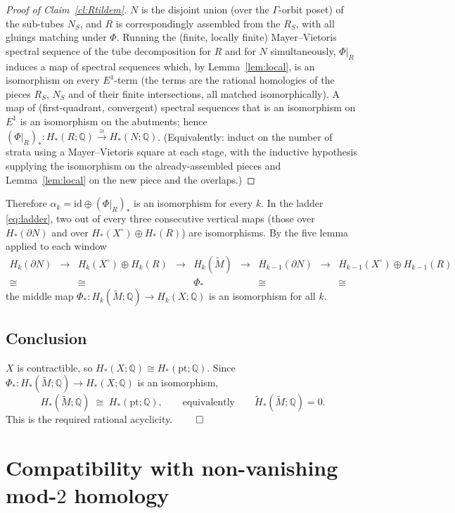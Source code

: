 \documentclass[12pt]{article}
\begin{document}
\begin{proof}[Proof of Claim~\ref{cl:Rtildem}]
$N$ is the disjoint union (over the $\Gamma$-orbit poset) of the sub-tubes
$N_S$, and $R$ is correspondingly assembled from the $R_S$, with all gluings
matching under $\Phi$. Running the (finite, locally finite) Mayer--Vietoris
spectral sequence of the tube decomposition for $R$ and for $N$
simultaneously, $\Phi|_R$ induces a map of spectral sequences which, by
Lemma~\ref{lem:local}, is an isomorphism on every $E^1$-term (the terms are
the rational homologies of the pieces $R_S$, $N_S$ and of their finite
intersections, all matched isomorphically). A map of (first-quadrant,
convergent) spectral sequences that is an isomorphism on $E^1$ is an
isomorphism on the abutments; hence
$(\Phi|_R)_*:H_*(R;\mathbb{Q})\xrightarrow{\cong}H_*(N;\mathbb{Q})$.
(Equivalently: induct on the number of strata using a Mayer--Vietoris square
at each stage, with the inductive hypothesis supplying the isomorphism on the
already-assembled pieces and Lemma~\ref{lem:local} on the new piece and the
overlaps.)
\end{proof}

Therefore $\alpha_k=\mathrm{id}\oplus(\Phi|_R)_*$ is an isomorphism for every
$k$. In the ladder \eqref{eq:ladder}, two out of every three consecutive
vertical maps (those over $H_*(\partial N)$ and over
$H_*(X^\circ)\oplus H_*(R)$) are isomorphisms. By the five lemma applied to
each window
\[
\begin{array}{ccccccccc}
H_k(\partial N)&\to&H_k(X^\circ)\!\oplus\! H_k(R)&\to&H_k(\widetilde M)&\to&H_{k-1}(\partial N)&\to&H_{k-1}(X^\circ)\!\oplus\! H_{k-1}(R)\\
\cong&&\cong&&\Phi_*&&\cong&&\cong
\end{array}
\]
the middle map $\Phi_*:H_k(\widetilde M;\mathbb{Q})\to H_k(X;\mathbb{Q})$ is an
isomorphism for all $k$.

\subsection*{Conclusion}
$X$ is contractible, so $H_*(X;\mathbb{Q})\cong H_*(\mathrm{pt};\mathbb{Q})$.
Since $\Phi_*:H_*(\widetilde M;\mathbb{Q})\to H_*(X;\mathbb{Q})$ is an
isomorphism,
\[
  H_*(\widetilde M;\mathbb{Q})\;\cong\;H_*(\mathrm{pt};\mathbb{Q}),
  \qquad\text{equivalently}\qquad
  \widetilde H_*(\widetilde M;\mathbb{Q})=0 .
\]
This is the required rational acyclicity. \hfill$\qed$

\section{Compatibility with non-vanishing mod-$2$ homology}\label{sec:mod2}
\end{document}
